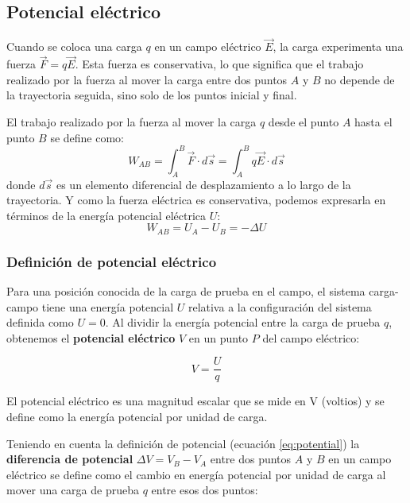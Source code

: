 \subsection{Potencial eléctrico}
\label{sec:potencial}

Cuando se coloca una carga \(q\) en un campo eléctrico \(\vec{E}\), la carga experimenta una fuerza \(\vec{F}=q\vec{E}\). Esta fuerza es conservativa, lo que significa que el trabajo realizado por la fuerza al mover la carga entre dos puntos \(A\) y \(B\) no depende de la trayectoria seguida, sino solo de los puntos inicial y final.

El trabajo realizado por la fuerza al mover la carga \(q\) desde el punto \(A\) hasta el punto \(B\) se define como:
\begin{equation*}
    W_{AB} = \int_A^B \vec{F} \cdot d\vec{s} = \int_A^B q\vec{E} \cdot d\vec{s}
\end{equation*}
donde \(d\vec{s}\) es un elemento diferencial de desplazamiento a lo largo de la trayectoria. Y como la fuerza eléctrica es conservativa, podemos expresarla en términos de la energía potencial eléctrica \(U\):
\begin{equation*}
    W_{AB} = U_A - U_B = -\Delta U
\end{equation*}

\subsubsection{Definición de potencial eléctrico}

Para una posición conocida de la carga de prueba en el campo, el sistema carga-campo tiene una energía potencial \(U\) relativa a la configuración del sistema definida como \(U=0\). Al dividir la energía potencial entre la carga de prueba \(q\), obtenemos el \textbf{potencial eléctrico} \(V\) en un punto \(P\) del campo eléctrico:

\begin{equation}
    V = \frac{U}{q}
    \label{eq:potential}
\end{equation}

El potencial eléctrico es una magnitud escalar que se mide en \(\text{V}\) (voltios) y se define como la energía potencial por unidad de carga.

Teniendo en cuenta la definición de potencial (ecuación \eqref{eq:potential}) la \textbf{diferencia de potencial} \(\Delta V = V_B - V_A\) entre dos puntos \(A\) y \(B\) en un campo eléctrico se define como el cambio en energía potencial por unidad de carga al mover una carga de prueba \(q\) entre esos dos puntos:

